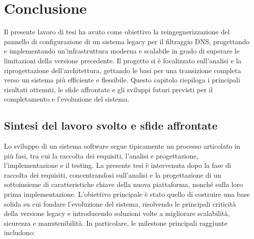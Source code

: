 \chapter{Conclusione}

Il presente lavoro di tesi ha avuto come obiettivo la reingegnerizzazione del pannello di configurazione di un sistema legacy per il filtraggio DNS, progettando e implementando un'infrastruttura moderna e scalabile in grado di superare le limitazioni della versione precedente. Il progetto si è focalizzato sull’analisi e la riprogettazione dell’architettura, gettando le basi per una transizione completa verso un sistema più efficiente e flessibile. Questo capitolo riepiloga i principali risultati ottenuti, le sfide affrontate e gli sviluppi futuri previsti per il completamento e l’evoluzione del sistema.

\section{Sintesi del lavoro svolto e sfide affrontate}
Lo sviluppo di un sistema software segue tipicamente un processo articolato in più fasi, tra cui la raccolta dei requisiti, l’analisi e progettazione, l’implementazione e il testing. La presente tesi è intervenuta dopo la fase di raccolta dei requisiti, concentrandosi sull'analisi e la progettazione di un sottoinsieme di caratteristiche chiave della nuova piattaforma, nonché sulla loro prima implementazione. L’obiettivo principale è stato quello di costruire una base solida su cui fondare l’evoluzione del sistema, risolvendo le principali criticità della versione legacy e introducendo soluzioni volte a migliorare scalabilità, sicurezza e manutenibilità.
%
In particolare, le milestone principali raggiunte includono:

